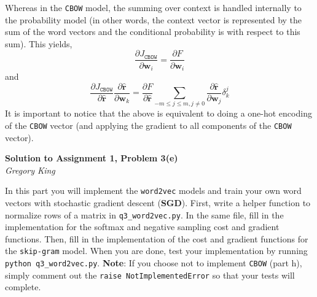 \documentclass[letter,12pt]{article}
\newcommand{\myhwtitle}[3]
{\begin{center}
{\large {\bf Solution to Assignment {#1}, Problem {#2}}}\\
\medskip 
{\it {#3}} %
\end{center}}
\begin{document}
\noindent Whereas in the \texttt{CBOW} model, the summing over context is handled internally to the probability model (in other words, the context vector is represented by the sum of the word vectors and the conditional probability is with respect to this sum). This yields,
\begin{equation}
\frac{\partial J_{\texttt{CBOW}}}{\partial{\boldsymbol w}_{i}} = \frac{\partial{F}}{\partial{\boldsymbol w}_{i}}
\end{equation}
and
\begin{equation}
\frac{\partial J_{\texttt{CBOW}}}{\partial{\hat{\boldsymbol r}}}\frac{\partial{\hat{\boldsymbol r}}}{\partial{\boldsymbol w}_{k}} = \frac{\partial{F}}{\partial{\hat{\boldsymbol r}}} \sum_{-m\le j\le m, j\neq0} \frac{\partial{\hat{\boldsymbol r}}}{\partial{\boldsymbol w}_{j}}\delta^{j}_{k}
\end{equation}
It is important to notice that the above is equivalent to doing a one-hot encoding of the \texttt{CBOW} vector (and applying the gradient to all components of the \texttt{CBOW} vector).
%

\clearpage
\myhwtitle{1}{3(e)}{Gregory King}
\bigskip
\noindent In this part you will implement the \texttt{word2vec} models and train your own word vectors with stochastic gradient descent (\textbf{SGD}). First,
write a helper function to normalize rows of a matrix in \texttt{q3\_word2vec.py}. In the same file, fill in the implementation for the softmax and negative sampling
cost and gradient functions. Then, fill in the implementation of the cost and gradient functions for the \texttt{skip-gram} model. When you are done, test your implementation
by running \texttt{python q3\_word2vec.py}. \textbf{Note}: If you choose not to implement \texttt{CBOW} (part h), simply comment out the \texttt{raise NotImplementedError}
so that your tests will complete.\vspace{5mm}
\end{document}
